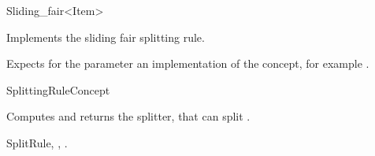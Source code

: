 

\begin{ccRefFunctionObjectClass}{Sliding_fair<Item>}  %




\ccDefinition
Implements the sliding fair splitting rule.


\ccParameters

Expects for the parameter  an implementation of the
 concept, for example .

\ccIsModel

SplittingRuleConcept

\ccTypes


\ccCreation
{}  %



{Computes and returns the splitter, that can split .}

\ccSeeAlso

SplitRule,
,
.
\end{ccRefFunctionObjectClass}


